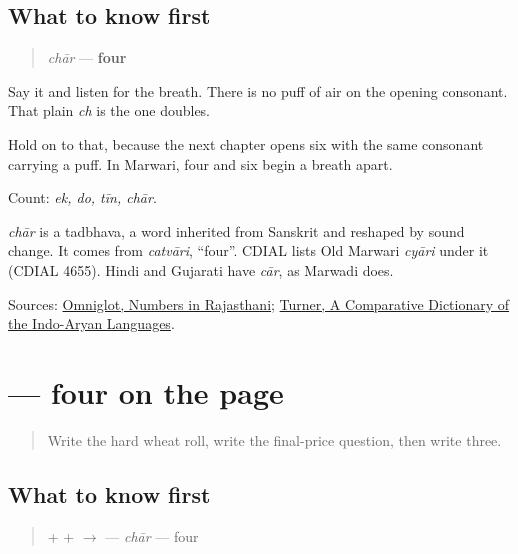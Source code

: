 \subsection*{What to know first}
\begin{quote}
\emph{chār} — \textbf{four}
\end{quote}

Say it and listen for the breath. There is no puff of air on the opening consonant. That plain \emph{ch} is the one \textbf{} doubles.

Hold on to that, because the next chapter opens six with the same consonant carrying a puff. In Marwari, four and six begin a breath apart.

Count: \emph{ek, do, tīn, chār}.

\begin{cousinweb}
\emph{chār} is a tadbhava, a word inherited from Sanskrit and reshaped by sound change. It comes from \emph{catvāri}, \textquotedblleft{}four\textquotedblright{}. CDIAL lists Old Marwari \emph{cyāri} under it (CDIAL 4655). Hindi and Gujarati have \emph{cār}, as Marwadi does.
\end{cousinweb}

\begin{tcolorbox}[breakable,colback=teal!4,colframe=teal!35!black,title={Before you move on}]
Sources: \href{https://www.omniglot.com/language/numbers/rajasthani.htm}{Omniglot, Numbers in Rajasthani}; \href{https://dsal.uchicago.edu/dictionaries/soas/}{Turner, A Comparative Dictionary of the Indo-Aryan Languages}.
\end{tcolorbox}
\section[\texorpdfstring{\mw{चार} (chār)}{चार (chār)}]{ — four on the page}

\label{lesson:MW-C32-chaar}



\begin{quote}
Write the hard wheat roll, write the final-price question, then write three.
\end{quote}

\subsection*{What to know first}
\begin{quote}
\textbf{} + \textbf{} + \textbf{} $\to$ \textbf{} — \emph{chār} — four
\end{quote}

